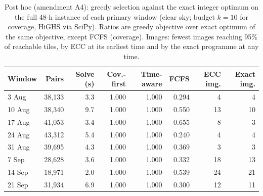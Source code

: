 \begin{table}[!t]
\centering
\footnotesize
\renewcommand{\arraystretch}{1.2}
\setlength{\tabcolsep}{4pt}
\caption{Post hoc (amendment A4): greedy selection against the exact integer optimum on the full 48-h
instance of each primary window (clear sky; budget $k = 10$ for coverage, HiGHS via SciPy). Ratios are
greedy objective over exact optimum of the same objective, except FCFS (coverage). Images: fewest images
reaching 95\% of reachable tiles, by ECC at its earliest time and by the exact programme at any time.}
\label{tab:a4_ilp48}
\begin{tabular}{|l|r|r|r|r|r|r|r|}
\hline
Window & Pairs & Solve (s) & Cov.-first & Time-aware & FCFS & ECC img. & Exact img. \\
\hline
3 Aug & 38,133 & 3.3 & 1.000 & 1.000 & 0.294 & 4 & 4 \\
\hline
10 Aug & 38,340 & 9.7 & 1.000 & 1.000 & 0.550 & 13 & 10 \\
\hline
17 Aug & 41,053 & 3.4 & 1.000 & 1.000 & 0.655 & 8 & 3 \\
\hline
24 Aug & 43,312 & 5.4 & 1.000 & 1.000 & 0.240 & 4 & 4 \\
\hline
31 Aug & 39,695 & 4.3 & 1.000 & 1.000 & 0.369 & 3 & 3 \\
\hline
7 Sep & 28,628 & 3.6 & 1.000 & 1.000 & 0.332 & 18 & 13 \\
\hline
14 Sep & 18,971 & 2.0 & 1.000 & 1.000 & 0.539 & 24 & 21 \\
\hline
21 Sep & 31,934 & 6.9 & 1.000 & 1.000 & 0.300 & 12 & 11 \\
\hline
\end{tabular}
\end{table}
